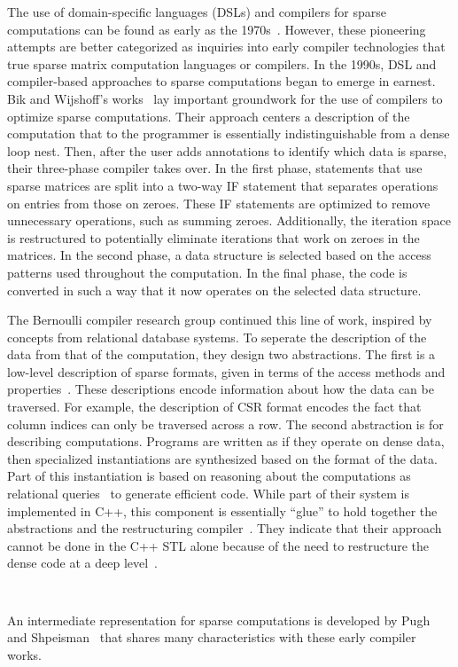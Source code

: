 The use of domain-specific languages (DSLs) and compilers for sparse computations can be found as early as the 1970s~\cite{calahan1971description,mchugh1974simpl}.
However, these pioneering attempts are better categorized as inquiries into early compiler technologies that true sparse matrix computation languages or compilers. 
In the 1990s, DSL and compiler-based approaches to sparse computations began to emerge in earnest.
Bik and Wijshoff's works~\cite{bik1993compilation, bik1993automatic,bik1996automatic} lay important groundwork for the use of compilers to optimize sparse computations.
Their approach centers a description of the computation that to the programmer is essentially indistinguishable from a dense loop nest. 
Then, after the user adds annotations to identify which data is sparse, their three-phase compiler takes over.
In the first phase, statements that use sparse matrices are split into a two-way IF statement that separates operations on entries from those on zeroes. 
These IF statements are optimized to remove unnecessary operations, such as summing zeroes.
Additionally, the iteration space is restructured to potentially eliminate iterations that work on zeroes in the matrices. 
In the second phase, a  data structure is selected based on the access patterns used throughout the computation. 
In the final phase, the code is converted in such a way that it now operates on the selected data structure.

The Bernoulli compiler research group continued this line of work, inspired by concepts from relational database systems. 
To seperate the description of the data from that of the computation, they design two abstractions.
The first is a low-level description of sparse formats, given in terms of the access methods and properties~\cite{kotlyar1997compiling}. 
These descriptions encode information about how the data can be traversed. 
For example, the description of CSR format encodes the fact that column indices can only be traversed across a row. 
The second abstraction is for describing computations.
Programs are written as if they operate on dense data, then specialized instantiations are synthesized based on the format of the data.
Part of this instantiation is based on reasoning about the computations as relational queries~\cite{kotlyar1997relational} to generate efficient code. 
While part of their system is implemented in C++, this component is essentially \enquote{glue} to hold together the abstractions and the restructuring compiler~\cite{mateev2000bernoulli}.
They indicate that their approach cannot be done in the C++ STL alone because of the need to restructure the dense code at a deep level~\cite{ahmed2000framework}.
\begin{figure}[h]
\begin{lstlisting}[caption={SpMV written using Bernoulli group representation.}]
  
\end{lstlisting}
\end{figure}
An intermediate representation for sparse computations is developed by Pugh and Shpeisman~\cite{pugh1999sipr} that shares many characteristics with these early compiler works.



